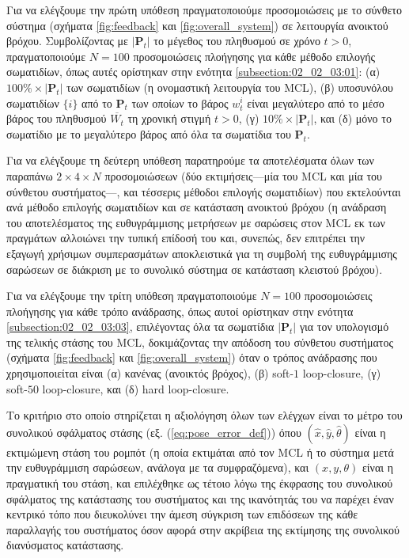 Για να ελέγξουμε την πρώτη υπόθεση πραγματοποιούμε προσομοιώσεις με το σύνθετο
σύστημα (σχήματα \ref{fig:feedback} και \ref{fig:overall_system}) σε
λειτουργία ανοικτού βρόχου. Συμβολίζοντας με $|\bm{P}_t|$ το μέγεθος του
πληθυσμού σε χρόνο $t>0$, πραγματοποιούμε $N=100$ προσομοιώσεις πλοήγησης για
κάθε μέθοδο επιλογής σωματιδίων, όπως αυτές ορίστηκαν στην ενότητα
\ref{subsection:02_02_03:01}: (α) $100\% \times |\bm{P}_t|$ των σωματιδίων (η
ονομαστική λειτουργία του MCL), (β) υποσυνόλου σωματιδίων $\{i\}$ από το
$\bm{P}_t$ των οποίων το βάρος $w_t^i$ είναι μεγαλύτερο από το μέσο βάρος του
πληθυσμού $\overline{W_t}$ τη χρονική στιγμή $t>0$, (γ) $10\% \times
|\bm{P}_t|$, και (δ) μόνο το σωματίδιο με το μεγαλύτερο βάρος από όλα τα
σωματίδια του $\bm{P}_t$.

Για να ελέγξουμε τη δεύτερη υπόθεση παρατηρούμε τα αποτελέσματα όλων των
παραπάνω $2\times4\times N$ προσομοιώσεων (δύο εκτιμήσεις---μία του MCL και μία
του σύνθετου συστήματος---, και τέσσερις μέθοδοι επιλογής σωματιδίων) που
εκτελούνται ανά μέθοδο επιλογής σωματιδίων και σε κατάσταση ανοικτού βρόχου (η
ανάδραση του αποτελέσματος της ευθυγράμμισης μετρήσεων με σαρώσεις στον MCL εκ
των πραγμάτων αλλοιώνει την τυπική επίδοσή του και, συνεπώς, δεν επιτρέπει την
εξαγωγή χρήσιμων συμπερασμάτων αποκλειστικά για τη συμβολή της ευθυγράμμισης
σαρώσεων σε διάκριση με το συνολικό σύστημα σε κατάσταση κλειστού βρόχου).

Για να ελέγξουμε την τρίτη υπόθεση πραγματοποιούμε $N=100$ προσομοιώσεις
πλοήγησης για κάθε τρόπο ανάδρασης, όπως αυτοί ορίστηκαν στην ενότητα
\ref{subsection:02_02_03:03}, επιλέγοντας όλα τα σωματίδια $|\bm{P}_t|$ για τον
υπολογισμό της τελικής στάσης του MCL, δοκιμάζοντας την απόδοση του σύνθετου
συστήματος (σχήματα \ref{fig:feedback} και \ref{fig:overall_system}) όταν ο
τρόπος ανάδρασης που χρησιμοποιείται είναι (α) κανένας (ανοικτός βρόχος), (β)
soft-$1$ loop-closure, (γ) soft-$50$ loop-closure, και (δ) hard loop-closure.

Το κριτήριο στο οποίο στηρίζεται η αξιολόγηση όλων των ελέγχων είναι το μέτρο
του συνολικού σφάλματος στάσης (εξ. (\ref{eq:pose_error_def})) όπου
$(\hat{x}, \hat{y}, \hat{\theta})$ είναι η εκτιμώμενη στάση του ρομπότ (η οποία
εκτιμάται από τον MCL ή το σύστημα μετά την ευθυγράμμιση σαρώσεων, ανάλογα με
τα συμφραζόμενα), και $(x,y,\theta)$ είναι η πραγματική του στάση, και
επιλέχθηκε ως τέτοιο λόγω της έκφρασης του συνολικού σφάλματος της κατάστασης
του συστήματος και της ικανότητάς του να παρέχει έναν κεντρικό τόπο που
διευκολύνει την άμεση σύγκριση των επιδόσεων της κάθε παραλλαγής του συστήματος
όσον αφορά στην ακρίβεια της εκτίμησης της συνολικού διανύσματος κατάστασης.

